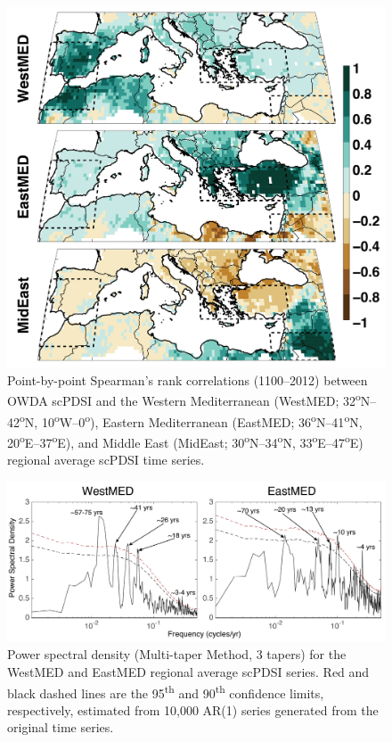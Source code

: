 \documentclass[draft,jgr]{AGUTeX}
\begin{document}
\begin{figure}
\center
\includegraphics[width=0.9\columnwidth]{fig_07_east_west_mideast_corrmap.png}
\caption{Point-by-point Spearman's rank correlations (1100--2012) between OWDA scPDSI and the Western Mediterranean (WestMED; 32\textsuperscript{o}N--42\textsuperscript{o}N, 10\textsuperscript{o}W--0\textsuperscript{o}), Eastern Mediterranean (EastMED; 36\textsuperscript{o}N--41\textsuperscript{o}N, 20\textsuperscript{o}E--37\textsuperscript{o}E), and Middle East (MidEast; 30\textsuperscript{o}N--34\textsuperscript{o}N, 33\textsuperscript{o}E--47\textsuperscript{o}E) regional average scPDSI time series.}\label{placeholder}
\end{figure}

\begin{figure}
\center
\includegraphics[width=1.0\columnwidth]{fig_08_eastwest_mtm_spectra.png}
\caption{Power spectral density (Multi-taper Method, 3 tapers) for the WestMED and EastMED regional average scPDSI series. Red and black dashed lines are the 95\textsuperscript{th} and 90\textsuperscript{th} confidence limits, respectively, estimated from 10,000 AR(1) series generated from the original time series.}\label{placeholder}
\end{figure}
\end{document}

